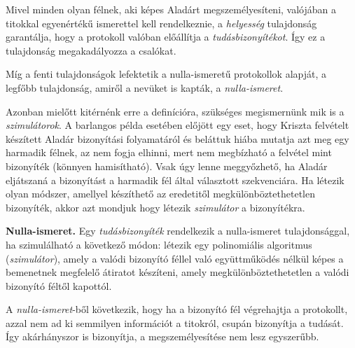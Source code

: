 Mivel minden olyan félnek, aki képes Aladárt megszemélyesíteni, valójában a titokkal egyenértékű ismerettel kell rendelkeznie, a \textit{helyesség} tulajdonság garantálja, hogy a protokoll valóban előállítja a \textit{tudásbizonyítékot}. Így ez a tulajdonság megakadályozza a csalókat.

Míg a fenti tulajdonságok lefektetik a nulla-ismeretű protokollok alapját, a legfőbb tulajdonság, amiről a nevüket is kapták, a \textit{nulla-ismeret}.

Azonban mielőtt kitérnénk erre a definícióra, szükséges megismernünk mik is a \textit{szimulátorok}. A barlangos példa esetében előjött egy eset, hogy Kriszta felvételt készített Aladár bizonyítási folyamatáról és beláttuk hiába mutatja azt meg egy harmadik félnek, az nem fogja elhinni, mert nem megbízható a felvétel mint bizonyíték (könnyen hamisítható). Vsak úgy lenne meggyőzhető, ha Aladár eljátszaná a bizonyítást a harmadik fél által választott szekvenciára. Ha létezik olyan módszer, amellyel készíthető az eredetitől megkülönböztethetetlen bizonyíték, akkor azt mondjuk hogy létezik \textit{szimulátor} a bizonyítékra.

\begin{definition}
    \textbf{Nulla-ismeret.} Egy \textit{tudásbizonyíték} rendelkezik a nulla-ismeret tulajdonsággal, ha szimulálható a következő módon: létezik egy polinomiális algoritmus (\textit{szimulátor}), amely a valódi bizonyító féllel való együttműködés nélkül képes a bemenetnek megfelelő átiratot készíteni, amely megkülönböztethetetlen a valódi bizonyító féltől kapottól.
\end{definition}

A \textit{nulla-ismeret}-ből következik, hogy ha a bizonyító fél végrehajtja a protokollt, azzal nem ad ki semmilyen információt a titokról, csupán bizonyítja a tudását. Így akárhányszor is bizonyítja, a megszemélyesítése nem lesz egyszerűbb.